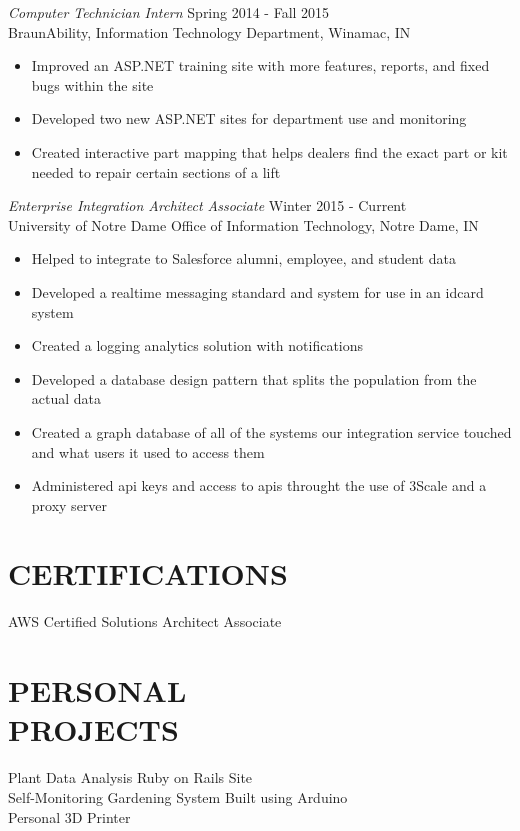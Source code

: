 \documentclass[margin]{res}
\begin{document}
\begin{resume}
{\sl Computer Technician Intern} \hfill Spring 2014 - Fall 2015 \\
                BraunAbility, 
                Information Technology Department, Winamac, IN 
                 \begin{itemize}  \itemsep -2pt %
                 \item Improved an ASP.NET training site with more features, reports, and fixed bugs within the site
                \item   Developed two new ASP.NET sites for department use and monitoring
                \item
                Created interactive part mapping that helps dealers find the exact part or kit needed to repair certain sections of a lift
                \end{itemize}

{\sl Enterprise Integration Architect Associate} \hfill Winter 2015 - Current \\
                University of Notre Dame
                Office of Information Technology, Notre Dame, IN
                \begin{itemize} \itemsep -2pt
                  \item Helped to integrate to Salesforce alumni, employee, and student data
                  \item Developed a realtime messaging standard and system for use in an idcard system
                  \item Created a logging analytics solution with notifications
                  \item Developed a database design pattern that splits the population from the actual data
                  \item Created a graph database of all of the systems our integration service touched and what users it used to access them
                  \item Administered api keys and access to apis throught the use of 3Scale and a proxy server
                \end{itemize}

\section{CERTIFICATIONS}
            AWS Certified Solutions Architect Associate \\

\section{PERSONAL \\ PROJECTS}
            Plant Data Analysis Ruby on Rails Site\\
            Self-Monitoring Gardening System Built using Arduino\\
            Personal 3D Printer\\
\end{resume}
\end{document}
